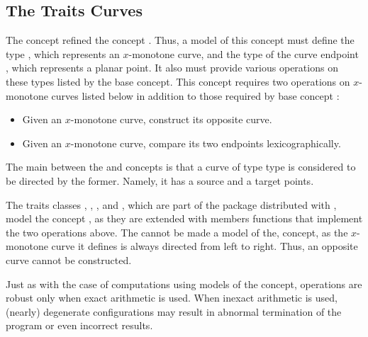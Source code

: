 \subsection{The Traits Curves}
\label{bso_ssec:traits_curves}
The concept  refined the 
concept . Thus, a model of this 
concept must define the type , which represents 
an $x$-monotone curve, and the type of the curve endpoint , 
which represents a planar point. It also must provide various operations 
on these types listed by the base concept. This  concept requires two 
operations on $x$-monotone curves listed below in addition to those
required by base concept :
\begin{itemize}
\item Given an $x$-monotone curve, construct its opposite curve.
\item Given an $x$-monotone curve, compare its two endpoints 
lexicographically.
\end{itemize}
The main  between the
 and
 concepts  is that a curve
of type  type is considered to be directed by
the former. Namely, it has a source and a target points.

The traits classes , 
, ,
and , which are part of the  
package distributed with \cgal, model the concept 
, as they are extended with 
members functions that implement the two operations above.
The  cannot be made a model of the, 
 concept, as the
$x$-monotone curve it defines is always directed from left to right. Thus, an
opposite curve cannot be constructed.

Just as with the case of computations using models of the 
 concept, operations are robust only
when exact arithmetic is used. When inexact arithmetic is used,
(nearly) degenerate configurations may result in abnormal termination
of the program or even incorrect results.

